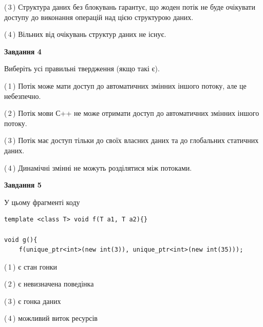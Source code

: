 \documentclass[12pt, ukrainian]{article}
\begin{document}
\begin {large}
{(\,3\,) Структура даних без блокувань гарантує, що жоден потік не буде очікувати доступу до виконання операцій над цією структурою даних.%

(\,4\,) Вільних від очікувань структур даних не існує.%



\begin{center}
\textbf{Завдання 4}
\end{center}
Виберіть усі правильні твердження (якщо такі є).\par
\vspace{2mm}

(\,1\,) Потік може мати доступ до автоматичних змінних іншого потоку, але це небезпечно.%

(\,2\,) Потік мови С++ не може отримати доступ до автоматичних змінних іншого потоку.%

(\,3\,) Потік має доступ тільки до своїх власних даних та до глобальних статичних даних.%

(\,4\,) Динамічні змінні не можуть розділятися між потоками.%



\begin{center}
\textbf{Завдання 5}
\end{center}
У цьому фрагменті коду
\begin{verbatim}
template <class T> void f(T a1, T a2){}

void g(){
    f(unique_ptr<int>(new int(3)), unique_ptr<int>(new int(35)));
\end{verbatim}

(\,1\,) є стан гонки%

(\,2\,) є невизначена поведінка%

(\,3\,) є гонка даних%

(\,4\,) можливий виток ресурсів%


}
\end {large}
\end{document}
